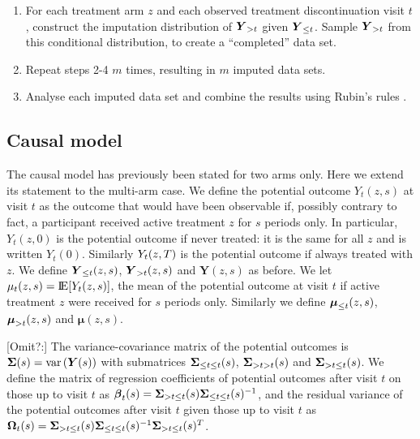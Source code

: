 \begin{enumerate}

\item For each treatment arm $z$ and each observed treatment discontinuation visit $t$, construct the imputation distribution of  $\boldsymbol{Y}_{{>t}}$ given  $\boldsymbol{Y}_{{\le{t}}}$. 
Sample $\boldsymbol{Y}_{{>t}}$ from this   conditional distribution, to create a “completed” data set.

\item Repeat steps 2-4 $m$ times, resulting in $m$ imputed data sets.

\item Analyse each imputed data set and combine the results using Rubin's rules \citep{Rubin87}.

\end{enumerate}



\subsection{Causal model}

The causal model has previously been stated for two arms only. Here we extend its statement to the multi-arm case. 
We define the potential outcome $Y_t(z,s)$ at visit $t$ as the outcome that would have been observable if, possibly contrary to fact, a participant received active treatment $z$ for $s$ periods only.
In particular, $Y_t(z,0)$ is the potential outcome if never treated: it is the same for all $z$ and is written $Y_t(0)$. Similarly $Y_t(z,T)$ is the potential outcome if always treated with $z$.
We define 
$\boldsymbol{Y}_{{\le{t}}}(z,s)$, $\boldsymbol{Y}_{{>t}}(z,s)$ and $\boldsymbol{Y}(z,s)$ as before.
We let 
$\mu_t(z,s) = \E[Y_t(z,s)]$, the mean of the potential outcome at visit $t$ if active treatment $z$ were received for $s$ periods only. Similarly we define 
$\boldsymbol{\mu}_{\le{t}}(z,s)$, $\boldsymbol{\mu}_{>t}(z,s)$ and $\boldsymbol{\mu}(z,s)$.

[Omit?:] 
The variance-covariance matrix  of the potential  outcomes is $\boldsymbol{\Sigma}(s)={\rm var}\left(\boldsymbol{Y}(s)\right)$ with submatrices 
$\boldsymbol{\Sigma}_{{\le{t}}{\le{t}}}(s)$,
$\boldsymbol{\Sigma}_{{>t}{>t}}(s)$ and
$\boldsymbol{\Sigma}_{{>t}{\le{t}}}(s)$.
We define 
the matrix of regression coefficients of  potential outcomes after visit  $t$ on those up to visit  $t$
as $\boldsymbol{\beta}_t(s) = \boldsymbol{\Sigma}_{{>t}{\le{t}}}(s) \boldsymbol{\Sigma}_{{\le{t}}{\le{t}}}(s)^{-1}$, and 
the residual variance of the potential outcomes after visit  $t$ given those up to visit  $t$ as
$\boldsymbol{\Omega}_t(s) = \boldsymbol{\Sigma}_{{>t}{\le{t}}}(s)
\boldsymbol{\Sigma}_{{\le{t}}{\le{t}}}(s)^{-1}
\boldsymbol{\Sigma}_{{>t}{\le{t}}}(s)^T$.


